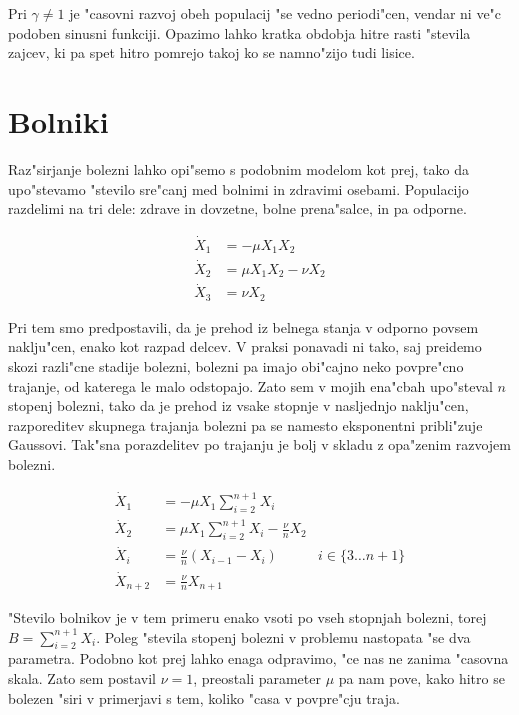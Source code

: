 \documentclass[a4paper,10pt]{article}
\begin{document}
Pri $\gamma\neq 1$ je "casovni razvoj obeh populacij "se vedno periodi"cen, vendar ni ve"c podoben sinusni funkciji. Opazimo lahko kratka obdobja hitre rasti "stevila zajcev, ki pa spet hitro pomrejo takoj ko se namno"zijo tudi lisice. 


\clearpage
\section{Bolniki}

Raz"sirjanje bolezni lahko opi"semo s podobnim modelom kot prej, tako da upo"stevamo "stevilo sre"canj med bolnimi in zdravimi osebami. Populacijo razdelimi na tri dele: zdrave in dovzetne, bolne prena"salce, in pa odporne. 

\begin{align}
  \dot X_1 &= -\mu X_1 X_2 \\
  \dot X_2 &= \mu X_1 X_2 - \nu X_2 \\
  \dot X_3 &= \nu X_2
\end{align}

Pri tem smo predpostavili, da je prehod iz belnega stanja v odporno povsem naklju"cen, enako kot razpad delcev. V praksi ponavadi ni tako, saj preidemo skozi razli"cne stadije bolezni, bolezni pa imajo obi"cajno neko povpre"cno trajanje, od katerega le malo odstopajo. Zato sem v mojih ena"cbah upo"steval $n$ stopenj bolezni, tako da je prehod iz vsake stopnje v nasljednjo naklju"cen, razporeditev skupnega trajanja bolezni pa se namesto eksponentni pribli"zuje Gaussovi. Tak"sna porazdelitev po trajanju je bolj v skladu z opa"zenim razvojem bolezni. 

\begin{align}
  \dot X_1 &= -\mu X_1 \sum_{i=2}^{n+1} X_i \\
  \dot X_2 &= \mu X_1 \sum_{i=2}^{n+1} X_i - \frac{\nu}{n} X_2 \\
  \dot X_i &= \frac{\nu}{n} ( X_{i-1} - X_i ) & i \in \{ 3\dots n+1 \} \\
  \dot X_{n+2} &= \frac{\nu}{n} X_{n+1}
\end{align}

"Stevilo bolnikov je v tem primeru enako vsoti po vseh stopnjah bolezni, torej $B = \sum_{i=2}^{n+1} X_i$. Poleg "stevila stopenj bolezni v problemu nastopata "se dva parametra. Podobno kot prej lahko enaga odpravimo, "ce nas ne zanima "casovna skala. Zato sem postavil $\nu=1$, preostali parameter $\mu$ pa nam pove, kako hitro se bolezen "siri v primerjavi s tem, koliko "casa v povpre"cju traja. 
\end{document}
